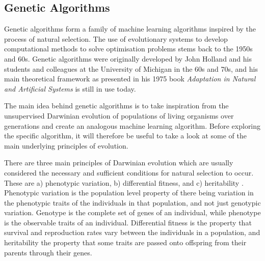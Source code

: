 \documentclass[multicolumn, 9pt]{extarticle}
\begin{document}
\subsection{Genetic Algorithms}
Genetic algorithms form a family of machine learning algorithms inspired by the process of natural selection. The use of evolutionary systems to develop computational methods to solve optimisation problems stems back to the 1950s and 60s. Genetic algorithms were originally developed by John Holland and his students and colleagues at the University of Michigan in the 60s and 70s, and his main theoretical framework as presented in his 1975 book \textit{Adaptation in Natural and Artificial Systems} \cite{Holland} is still in use today.

The main idea behind genetic algorithms is to take inspiration from the unsupervised Darwinian evolution of populations of living organisms over generations and create an analogous machine learning algorithm. Before exploring the specific algorithm, it will therefore be useful to take a look at some of the main underlying principles of evolution. 

There are three main principles of Darwinian evolution which are usually considered the necessary and sufficient conditions for natural selection to occur. These are a) phenotypic variation, b) differential fitness, and c) heritability \cite{Eyal}. Phenotypic variation is the population level property of there being variation in the phenotypic traits of the individuals in that population, and not just genotypic variation. Genotype is the complete set of genes of an individual, while phenotype is the observable traits of an individual. Differential fitness is the property that survival and reproduction rates vary between the individuals in a population, and heritability the property that some traits are passed onto offspring from their parents through their genes. 
\end{document}
